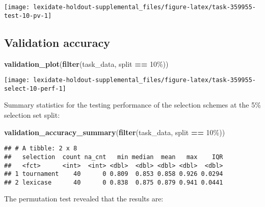\documentclass[
]{book}
\newenvironment{Shaded}{\begin{snugshade}}{\end{snugshade}}
\newcommand{\FunctionTok}[1]{\textcolor[rgb]{0.13,0.29,0.53}{\textbf{#1}}}
\newcommand{\NormalTok}[1]{#1}
\newcommand{\SpecialCharTok}[1]{\textcolor[rgb]{0.81,0.36,0.00}{\textbf{#1}}}
\newcommand{\StringTok}[1]{\textcolor[rgb]{0.31,0.60,0.02}{#1}}
\begin{document}
\texttt{[image: lexidate-holdout-supplemental\_files/figure-latex/task-359955-test-10-pv-1]}

\hypertarget{validation-accuracy-11}{%
\subsection{Validation accuracy}\label{validation-accuracy-11}}

\begin{Shaded}
\begin{Highlighting}[]
\FunctionTok{validation\_plot}\NormalTok{(}\FunctionTok{filter}\NormalTok{(task\_data, split }\SpecialCharTok{==} \StringTok{\textquotesingle{}10\%\textquotesingle{}}\NormalTok{))}
\end{Highlighting}
\end{Shaded}

\texttt{[image: lexidate-holdout-supplemental\_files/figure-latex/task-359955-select-10-perf-1]}

Summary statistics for the testing performance of the selection schemes at the 5\% selection set split:

\begin{Shaded}
\begin{Highlighting}[]
\FunctionTok{validation\_accuracy\_summary}\NormalTok{(}\FunctionTok{filter}\NormalTok{(task\_data, split }\SpecialCharTok{==} \StringTok{\textquotesingle{}10\%\textquotesingle{}}\NormalTok{))}
\end{Highlighting}
\end{Shaded}

\begin{verbatim}
## # A tibble: 2 x 8
##   selection  count na_cnt   min median  mean   max    IQR
##   <fct>      <int>  <int> <dbl>  <dbl> <dbl> <dbl>  <dbl>
## 1 tournament    40      0 0.809  0.853 0.858 0.926 0.0294
## 2 lexicase      40      0 0.838  0.875 0.879 0.941 0.0441
\end{verbatim}

The permutation test revealed that the results are:
\end{document}
